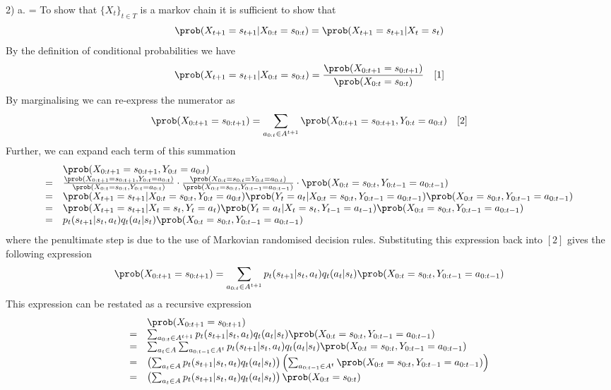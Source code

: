 \documentclass[11pt,a4paper]{article}
\begin{document}
\begin{answer}{2) a.}
  \everymath={\displaystyle}
  To show that $\{X_t\}_{t\in T}$ is a markov chain it is sufficient to show that
  \[ \prob(X_{t+1}=s_{t+1}|X_{0:t}=s_{0:t})=\prob(X_{t+1}=s_{t+1}|X_t=s_t) \]
  By the definition of conditional probabilities we have
  \[ \prob(X_{t+1}=s_{t+1}|X_{0:t}=s_{0:t})=\frac{\prob(X_{0:t+1}=s_{0:t+1})}{\prob(X_{0:t}=s_{0:t})}\quad[1] \]
  By marginalising we can re-express the numerator as
  \[ \prob(X_{0:t+1}=s_{0:t+1})=\sum_{a_{0:t}\in A^{t+1}}\prob(X_{0:t+1}=s_{0:t+1},Y_{0:t}=a_{0:t})\quad[2] \]
  Further, we can expand each term of this summation
  \[\begin{array}{rl}
    &\prob(X_{0:t+1}=s_{0:t+1},Y_{0:t}=a_{0:t})\\
    =&\frac{\prob(X_{0:t+1}=s_{0:t+1},Y_{0:t}=a_{0:t})}{\prob(X_{0:t}=s_{0:t},Y_{0:t}=a_{0:t})}\cdot\frac{\prob(X_{0:t}=s_{0:t}=Y_{0:t}=a_{0:t})}{\prob(X_{0:t}=s_{0:t},Y_{0:t-1}=a_{0:t-1})}\cdot\prob(X_{0:t}=s_{0:t},Y_{0:t-1}=a_{0:t-1})\\
    =&\prob(X_{t+1}=s_{t+1}|X_{0:t}=s_{0:t},Y_{0:t}=a_{0:t})\prob(Y_t=a_t|X_{0:t}=s_{0:t},Y_{0:t-1}=a_{0:t-1})\prob(X_{0:t}=s_{0:t},Y_{0:t-1}=a_{0:t-1})\\
    =&\prob(X_{t+1}=s_{t+1}|X_t=s_t,Y_t=a_t)\prob(Y_t=a_t|X_t=s_t,Y_{t-1}=a_{t-1})\prob(X_{0:t}=s_{0:t},Y_{0:t-1}=a_{0:t-1})\\
    =&p_t(s_{t+1}|s_t,a_t)q_t(a_t|s_t)\prob(X_{0:t}=s_{0:t},Y_{0:t-1}=a_{0:t-1})
  \end{array}\]
  where the penultimate step is due to the use of Markovian randomised decision rules. Substituting this expression back into $[2]$ gives the following expression
  \[ \prob(X_{0:t+1}=s_{0:t+1})=\sum_{a_{0:t}\in A^{t+1}}p_t(s_{t+1}|s_t,a_t)q_t(a_t|s_t)\prob(X_{0:t}=s_{0:t},Y_{0:t-1}=a_{0:t-1}) \]
  This expression can be restated as a recursive expression
  \[\begin{array}{rl}
    &\prob(X_{0:t+1}=s_{0:t+1})\\
    =&\sum_{a_{0:t}\in A^{t+1}}p_t(s_{t+1}|s_t,a_t)q_t(a_t|s_t)\prob(X_{0:t}=s_{0:t},Y_{0:t-1}=a_{0:t-1})\\
    =&\sum_{a_t\in A}\sum_{a_{0:t-1}\in A^t}p_t(s_{t+1}|s_t,a_t)q_t(a_t|s_t)\prob(X_{0:t}=s_{0:t},Y_{0:t-1}=a_{0:t-1})\\
    =&\left(\sum_{a_t\in A}p_t(s_{t+1}|s_t,a_t)q_t(a_t|s_t)\right)\left(\sum_{a_{0:t-1}\in A^t}\prob(X_{0:t}=s_{0:t},Y_{0:t-1}=a_{0:t-1})\right)\\
    =&\left(\sum_{a_t\in A}p_t(s_{t+1}|s_t,a_t)q_t(a_t|s_t)\right)\prob(X_{0:t}=s_{0:t})\\

\end{array}\]
\end{answer}
\end{document}
